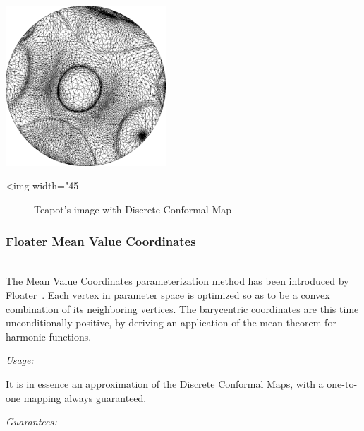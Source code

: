 \begin{center}
    \label{Surface_mesh_parameterization-fig-conformal_2}
    \begin{ccTexOnly}
        \includegraphics[width=0.45\textwidth]{Surface_mesh_parameterization/conformal_2}
    \end{ccTexOnly}
    \begin{ccHtmlOnly}
        <img width="45%
    \end{ccHtmlOnly}
    \begin{figure}[h]
        \caption{Teapot's image with Discrete Conformal Map}
    \end{figure}
\end{center}


\subsubsection{Floater Mean Value Coordinates}

  \\

The Mean Value Coordinates parameterization method has been introduced
by Floater~\cite{cgal:f-mvc-03}. Each vertex in parameter space is
optimized so as to be a convex combination of its neighboring
vertices. The barycentric coordinates are this time unconditionally
positive, by deriving an application of the mean theorem for harmonic
functions.

\emph{Usage:}

It is in essence an approximation of the Discrete Conformal
Maps, with a one-to-one mapping always guaranteed.

\emph{Guarantees:}

